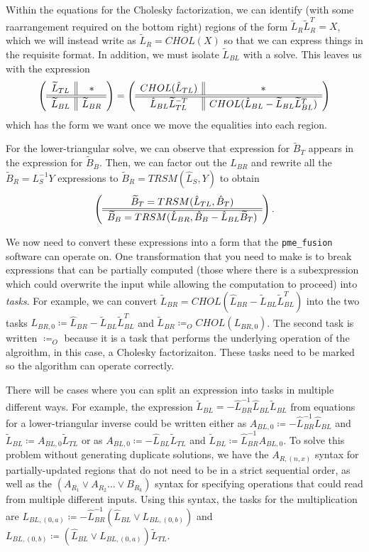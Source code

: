 \documentclass[12pt,letterpaper]{article}
\begin{document}
Within the equations for the Cholesky factorization, we can identify (with some raarrangement required on the bottom right) regions of the form $\widetilde{L}_R\widetilde{L}_R^T = X$, which we will instead write as $\widetilde{L}_R = CHOL(X)$ so that we can express things in the requisite format.
In addition, we must isolate $\widetilde{L}_{BL}$ with a solve.
This leaves us with the expression
\begin{equation*}
  \left( \begin{array}{c || c} \widetilde{L}_{TL} & * \\ \hline \hline \widetilde{L}_{BL} & \widetilde{L}_{BR} \end{array} \right)
  = \left( \begin{array}{c || c} CHOL(\hat{L}_{TL}) & * \\ \hline \hline \hat{L}_{BL}\widetilde{L}_{TL}^{-T} & CHOL(\hat{L}_{BL} - \widetilde{L}_{BL}\widetilde{L}_{BL}^T) \end{array} \right)
\end{equation*}
which has the form we want once we move the equalities into each region.

For the lower-triangular solve, we can observe that expression for $\widetilde{B}_T$ appears in the expression for $\widetilde{B}_B$.
Then, we can factor out the $\hat{L}_{BR}$ and rewrite all the $\widetilde{B}_R = L_S^{-1}Y$ expressions to $\widetilde{B}_R = TRSM(\hat{L}_S, Y)$ to obtain
\begin{equation*}
  \left( \begin{array}{c} \widetilde{B}_T = TRSM(\hat{L}_{TL}, \hat{B}_T) \\ \hline \hline \widetilde{B}_B = TRSM(\hat{L}_{BR}, \hat{B}_B - \hat{L}_{BL}\widetilde{B}_T) \end{array} \right).
\end{equation*}

We now need to convert these expressions into a form that the \texttt{pme\_fusion} software can operate on.
One transformation that you need to make is to break expressions that can be partially computed (those where there is a subexpression which could overwrite the input while allowing the computation to proceed) into \emph{tasks}.
For example, we can convert $\widetilde{L}_{BR} = CHOL(\hat{L}_{BR} - \widetilde{L}_{BL}\widetilde{L}_{BL}^T)$ into the two tasks $L_{BR, 0} \coloneqq \hat{L}_{BR} - \widetilde{L}_{BL}\widetilde{L}_{BL}^T$ and $\widetilde{L}_{BR} \coloneqq_O CHOL(L_{BR, 0})$.
The second task is written $\coloneqq_O$ because it is a task that performs the underlying operation of the algroithm, in this case, a Cholesky factorizaiton.
These tasks need to be marked so the algorithm can operate correctly.

There will be cases where you can split an expression into tasks in multiple different ways.
For example, the expression $\widetilde{L}_{BL} = -\hat{L}_{BR}^{-1}\hat{L}_{BL}\widetilde{L}_{BL}$ from equations for a lower-triangular inverse could be written either as $A_{BL, 0} \coloneqq -\hat{L}_{BR}^{-1}\hat{L}_{BL}$ and $\widetilde{L}_{BL} \coloneqq A_{BL, 0}\widetilde{L}_{TL}$ or as $A_{BL, 0} \coloneqq -\hat{L}_{BL}\widetilde{L}_{TL}$ and $\widetilde{L}_{BL} \coloneqq \hat{L}_{BR}^{-1}A_{BL, 0}$.
To solve this problem without generating duplicate solutions, we have the $A_{R, (n, x)}$ syntax for partially-updated regions that do not need to be in a strict sequential order, as well as the $(A_{R_1} \vee A_{R_2} \ldots \vee B_{R_k})$ syntax for specifying operations that could read from multiple different inputs.
Using this syntax, the tasks for the multiplication are $L_{BL, (0, a)} \coloneqq -\hat{L}_{BR}^{-1}(\hat{L}_{BL} \vee L_{BL, (0, b)})$ and $L_{BL, (0, b)} \coloneqq (\hat{L}_{BL} \vee L_{BL, (0, a)})\widetilde{L}_{TL}$.
\end{document}
